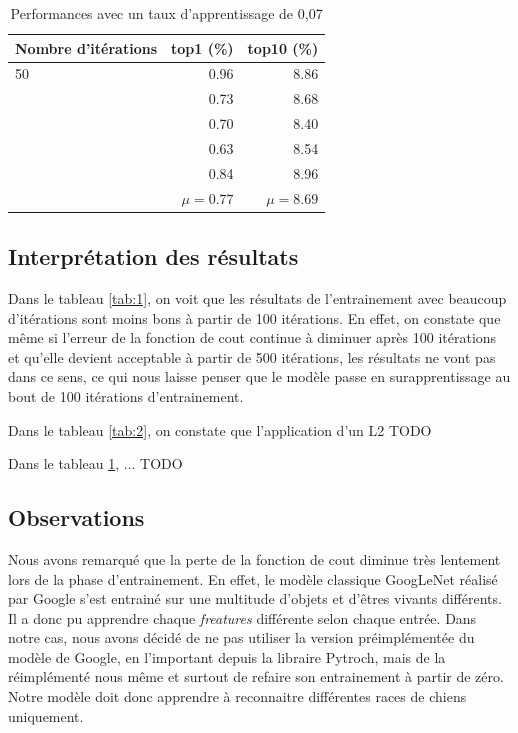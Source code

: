 \documentclass{article}
\begin{document}
\begin{table}[htbp]
\centering
\begin{tabular}{lrr}  
\toprule
Nombre d'itérations & top1 (\%) & top10 (\%) \\
\midrule
50 & 0.96 & 8.86 \\
     & 0.73 & 8.68 \\
     & 0.70 & 8.40 \\
     & 0.63 & 8.54 \\
     & 0.84 & 8.96 \\
     & $\mu = 0.77$ &  $\mu = 8.69$ \\
\bottomrule
\end{tabular}
\caption{Performances avec un taux d'apprentissage de 0,07}
\label{tab:3}
\end{table}

\subsection{Interprétation des résultats}
Dans le tableau \ref{tab:1}, on voit que les résultats de l’entrainement avec
beaucoup d’itérations sont moins bons à partir de 100 itérations. En effet, on
constate que même si l’erreur de la fonction de cout continue à diminuer après
100 itérations et qu’elle devient acceptable à partir de 500 itérations, les
résultats ne vont pas dans ce sens, ce qui nous laisse penser que le modèle
passe en surapprentissage au bout de 100 itérations d’entrainement.

Dans le tableau \ref{tab:2}, on constate que l'application d'un L2 TODO

Dans le tableau \ref{tab:3}, ... TODO

\subsection{Observations}
Nous avons remarqué que la perte de la fonction de cout diminue très lentement
lors de la phase d’entrainement. En effet, le modèle classique GoogLeNet réalisé
par Google s’est entrainé sur une multitude d’objets et d'êtres vivants
différents. Il a donc pu apprendre chaque \textit{freatures} différente selon
chaque entrée. Dans notre cas, nous avons décidé de ne pas utiliser la version
préimplémentée du modèle de Google, en l'important depuis la libraire Pytroch,
mais de la réimplémenté nous même et surtout de refaire son entrainement à
partir de zéro. Notre modèle doit donc apprendre à reconnaitre différentes races
de chiens uniquement.
\end{document}
